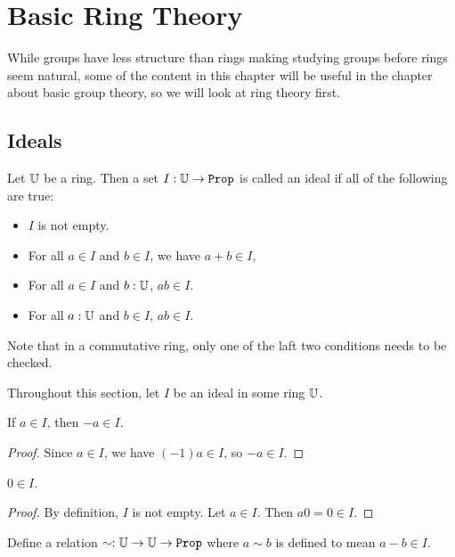\documentclass[../../math.tex]{subfiles}
\begin{document}
\setcounter{chapter}{12}

\chapter{Basic Ring Theory}

While groups have less structure than rings making studying groups before rings
seem natural, some of the content in this chapter will be useful in the chapter
about basic group theory, so we will look at ring theory first.

\section{Ideals}

\begin{definition}
    Let $\mathbb{U}$ be a ring.  Then a set $I : \U \to \Prop$ is called an ideal if all
    of the following are true:
    \begin{itemize}
        \item $I$ is not empty.
        \item For all $a \in I$ and $b \in I$, we have $a + b \in I$,
        \item For all $a \in I$ and $b : \mathbb{U}$, $ab \in I$.
        \item For all $a : \mathbb{U}$ and $b \in I$, $ab \in I$.
    \end{itemize}
    Note that in a commutative ring, only one of the laft two conditions needs
    to be checked.
\end{definition}

Throughout this section, let $I$ be an ideal in some ring $\mathbb{U}$.

\begin{theorem} \label{ideal_neg}
    If $a \in I$, then $-a \in I$.
\end{theorem}
\begin{proof}
    Since $a \in I$, we have $(-1)a \in I$, so $-a \in I$.
\end{proof}

\begin{theorem} \label{ideal_zero}
    $0 \in I$.
\end{theorem}
\begin{proof}
    By definition, $I$ is not empty.  Let $a \in I$.  Then $a0 = 0 \in I$.
\end{proof}

\begin{definition}
    Define a relation $\sim : \U \to \U \to \Prop$ where $a \sim b$ is defined
    to mean $a - b \in I$.
\end{definition}
\end{document}
